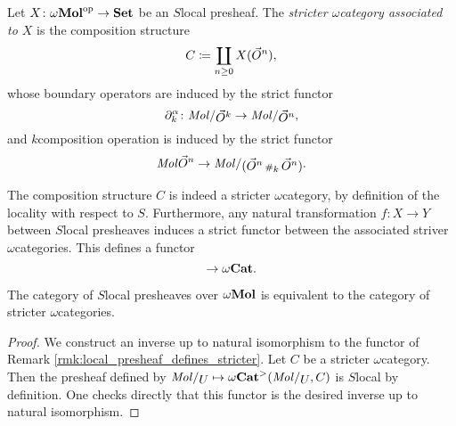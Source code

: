 \begin{dfn}
    Let \( X \colon \omega\mathbf{Mol}^\mathrm{op} \to \mathbf{Set} \) be an \( S \)\nbd local presheaf.
    The \emph{stricter \( \omega \)\nbd category associated to \( X \)} is the composition structure 
    \begin{equation*}
        C \coloneqq \coprod_{n \geq 0} X(\vec{O}^{n}),
    \end{equation*}
    whose boundary operators are induced by the strict functor
    \begin{equation*}
        \bd{k}{\a} \colon \molecin{\dglobe{k}} \to \molecin{\dglobe{n}}, 
    \end{equation*}
    and \( k \)\nbd composition operation is induced by the strict functor
    \begin{equation*}
        \molec{\dglobe{n}} \to \molecin{(\dglobe{n} \cp{k} \dglobe{n})}.
    \end{equation*}
\end{dfn}

\begin{rmk}\label{rmk:local_presheaf_defines_stricter}
    The composition structure \( C \) is indeed a stricter \( \omega \)\nbd category, by definition of the locality with respect to \( S \).
    Furthermore, any natural transformation \( f \colon X \to Y \) between \( S \)\nbd local presheaves induces a strict functor between the associated striver \( \omega \)\nbd categories.
    This defines a functor
    \begin{equation*}
        [\opp{\omegaMol}, \Set] \to \omegaCat.
    \end{equation*}
\end{rmk}

\begin{prop} \label{prop:stricter_cat_are_local_presheaves}
    The category of \( S \)\nbd local presheaves over \( \omega\mathbf{Mol} \) is equivalent to the category of stricter \( \omega \)\nbd categories.
\end{prop}
\begin{proof}
    We construct an inverse up to natural isomorphism to the functor of Remark \ref{rmk:local_presheaf_defines_stricter}.
    Let \( C \) be a stricter \( \omega \)\nbd category.
    Then the presheaf defined by \(\molecin{U} \mapsto \somegaCat(\molecin{U}, C) \) is \( S \)\nbd local by definition. 
    One checks directly that this functor is the desired inverse up to natural isomorphism.
\end{proof}

